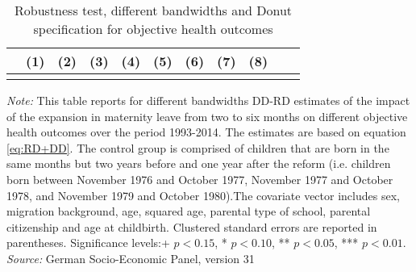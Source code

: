 \documentclass[a4paper ]{article}
\begin{document}
\newpage
\begin{landscape}
\begin{table}[p] \centering
\def\sym#1{\ifmmode^{#1}\else\(^{#1}\)\fi}
\caption{Robustness test, different bandwidths and Donut specification for objective health outcomes}\label{tab:OHBW}
\begin{tabular}{l*{10}{c}}
\toprule
  &\multicolumn{1}{c}{(1)}&\multicolumn{1}{c}{(2)}&\multicolumn{1}{c}{(3)}&\multicolumn{1}{c}{(4)}&\multicolumn{1}{c}{(5)}&\multicolumn{1}{c}{(6)}&\multicolumn{1}{c}{(7)}&\multicolumn{1}{c}{(8)} \\

\midrule\\
	 
 \bottomrule
\end{tabular}
\begin{minipage}{1.4\textwidth} %
{\footnotesize \textit{Note:} This table reports for different bandwidths DD-RD estimates of the impact of the expansion in maternity leave from two to six months on different objective health outcomes over the period 1993-2014. The estimates are based on equation \ref{eq:RD+DD}. The control group is comprised of children that are born in the same months but two years before and one year after the reform (i.e. children born between November 1976 and October 1977, November 1977 and October 1978, and November 1979 and October 1980).The covariate vector includes sex, migration background, age, squared age, parental type of school, parental citizenship and age at childbirth.\newline
Clustered standard errors are reported in parentheses. Significance levels:+ \(p<0.15\), * \(p<0.10\), ** \(p<0.05\), *** \(p<0.01\). \newline \textit{Source: }German Socio-Economic Panel, version 31\par}
\end{minipage}
\end{table}
\end{landscape}

\end{document}
